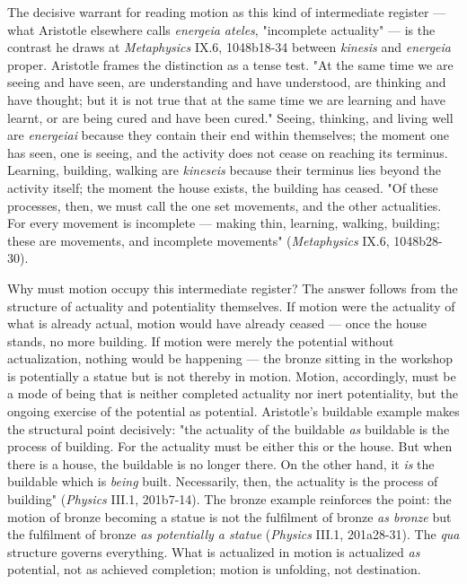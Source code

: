\documentclass[12pt]{article}
\begin{document}
The decisive warrant for reading motion as this kind of intermediate register --- what Aristotle elsewhere calls \textit{energeia ateles}, "incomplete actuality" --- is the contrast he draws at \textit{Metaphysics} IX.6, 1048b18-34 between \textit{kinesis} and \textit{energeia} proper. Aristotle frames the distinction as a tense test. "At the same time we are seeing and have seen, are understanding and have understood, are thinking and have thought; but it is not true that at the same time we are learning and have learnt, or are being cured and have been cured." Seeing, thinking, and living well are \textit{energeiai} because they contain their end within themselves; the moment one has seen, one is seeing, and the activity does not cease on reaching its terminus. Learning, building, walking are \textit{kineseis} because their terminus lies beyond the activity itself; the moment the house exists, the building has ceased. "Of these processes, then, we must call the one set movements, and the other actualities. For every movement is incomplete --- making thin, learning, walking, building; these are movements, and incomplete movements" (\textit{Metaphysics} IX.6, 1048b28-30).

Why must motion occupy this intermediate register? The answer follows from the structure of actuality and potentiality themselves. If motion were the actuality of what is already actual, motion would have already ceased --- once the house stands, no more building. If motion were merely the potential without actualization, nothing would be happening --- the bronze sitting in the workshop is potentially a statue but is not thereby in motion. Motion, accordingly, must be a mode of being that is neither completed actuality nor inert potentiality, but the ongoing exercise of the potential as potential. Aristotle's buildable example makes the structural point decisively: "the actuality of the buildable \textit{as} buildable is the process of building. For the actuality must be either this or the house. But when there is a house, the buildable is no longer there. On the other hand, it \textit{is} the buildable which is \textit{being} built. Necessarily, then, the actuality is the process of building" (\textit{Physics} III.1, 201b7-14). The bronze example reinforces the point: the motion of bronze becoming a statue is not the fulfilment of bronze \textit{as bronze} but the fulfilment of bronze \textit{as potentially a statue} (\textit{Physics} III.1, 201a28-31). The \textit{qua} structure governs everything. What is actualized in motion is actualized \textit{as} potential, not as achieved completion; motion is unfolding, not destination.
\end{document}
